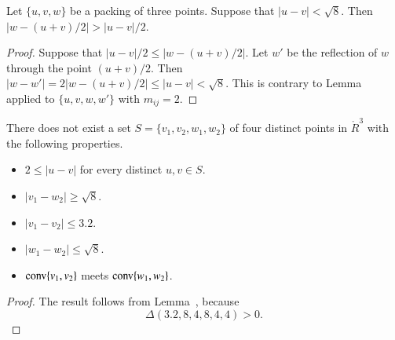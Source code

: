 \begin{tarskidata}
\begin{tarski}
\begin{lemma}
  Let $\{u,v,w\}$ be a packing of three points.  Suppose that 
$|u-v| <\sqrt8$.  Then $|w- (u+v)/2| > |u-v|/2$.
\end{lemma}

\begin{proof} Suppose that $|u-v|/2\le |w-(u+v)/2|$.
Let $w'$ be the reflection of $w$ through the point
$(u+v)/2$.  Then $|w-w'| = 2|w-(u+v)/2|\le |u-v| <\sqrt8$.
This is contrary to Lemma~ applied to
$\{u,v,w,w'\}$ with $m_{ij}=2$.  
\end{proof}
\end{tarski}







\begin{tarski}

\begin{lemma} 
There does not exist a set
$S=\{v_1,v_2,w_1,w_2\}$ of four distinct points
in $\ring{R}^3$ with the following properties.
\begin{itemize}
	\item $2\le |u-v|$ for every distinct $u,v\in S$.
          \item $|v_1-w_2|\ge \sqrt{8}$.
		\item $ |v_1-v_2| \le 3.2$.
	\item $|w_1-w_2|\le \sqrt{8}$.
	\item ${\operatorname{conv}}\{v_1,v_2\}$ meets
		${\operatorname{conv}}\{w_1,w_2\}$.
\end{itemize}
\end{lemma}


\begin{proof} The result follows from Lemma~,
because
  $$
  \Delta(3.2,8,4,8,4,4) > 0.
  $$
\end{proof}
\end{tarski}





\begin{tarski}


\end{tarski}
\end{tarskidata}
